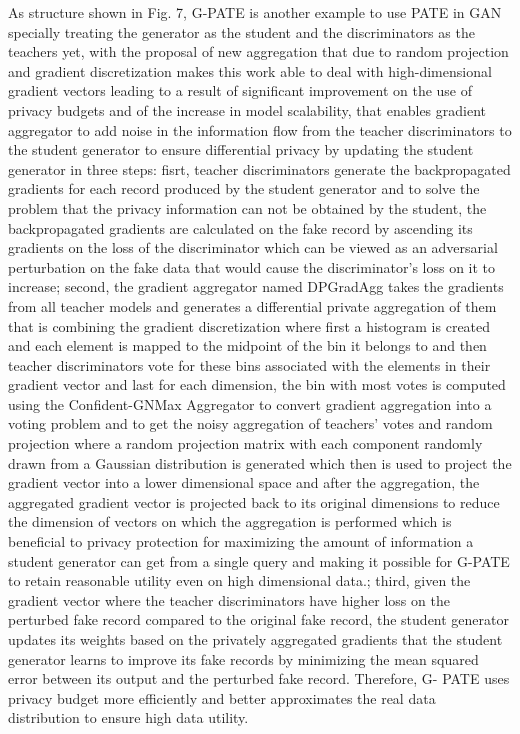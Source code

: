 \documentclass[conference]{IEEEtran}
\begin{document}
As structure shown in Fig. 7, G-PATE\cite{b35} is another example to use PATE in GAN specially treating the generator as the student and the discriminators as the teachers yet, with the proposal of new aggregation that due to random projection and gradient discretization makes this work able to deal with high-dimensional gradient vectors leading to a result of significant improvement on the use of privacy budgets and of the increase in model scalability, that enables gradient aggregator to add noise in the information flow from the teacher discriminators to the student generator to ensure differential privacy by updating the student generator in three steps: fisrt, teacher discriminators generate the backpropagated gradients for each record produced by the student generator and to solve the problem that the privacy information can not be obtained by the student, the backpropagated gradients  are calculated on the fake record by ascending its gradients on the loss of the discriminator which can be viewed as an adversarial perturbation on the fake data that would cause the discriminator’s loss on it to increase; second, the gradient aggregator named DPGradAgg takes the gradients from all teacher models and generates a differential private aggregation of them that is combining the gradient discretization where first a histogram is created and each element is mapped to the midpoint of the bin it belongs to and then teacher discriminators vote for these bins associated with the elements in their gradient vector and last for each dimension, the bin with most votes is computed using the Confident-GNMax Aggregator to convert gradient aggregation into a voting problem and to get the noisy aggregation of teachers’ votes and random projection where a random projection matrix with each component randomly drawn from a Gaussian distribution is generated which then is used to project the gradient vector into a lower dimensional space and after the aggregation, the aggregated gradient vector is projected back to its original dimensions to reduce the dimension of vectors on which the aggregation is performed which is beneficial to privacy protection for maximizing the amount of information a student generator can get from a single query and making it possible for G-PATE to retain reasonable utility even on high dimensional data.; third, given the gradient vector where the teacher discriminators have higher loss on the perturbed fake record compared to the original fake record, the student generator updates its weights based on the privately aggregated gradients that the student generator learns to improve its fake records by minimizing the mean squared error between its output and the perturbed fake record. Therefore, G- PATE uses privacy budget more efficiently and better approximates the real data distribution to ensure high data utility.
\end{document}
